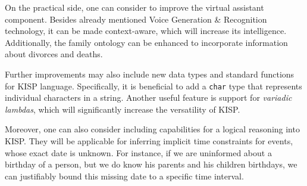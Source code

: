 On the practical side, one can consider to improve the virtual assistant component. Besides already mentioned Voice Generation \&
Recognition technology, it can be made context-aware, which will increase its intelligence. Additionally, the family ontology can
be enhanced to incorporate information about divorces and deaths.

Further improvements may also include new data types and standard functions for KISP language. Specifically, it is beneficial to
add a \texttt{char} type that represents individual characters in a string. Another useful feature is support for \textit{variadic
lambdas}, which will significantly increase the versatility of KISP.

Moreover, one can also consider including capabilities for a logical reasoning into KISP. They will be applicable for inferring
implicit time constraints for events, whose exact date is unknown. For instance, if we are uninformed about a birthday of a
person, but we do know his parents and his children birthdays, we can justifiably bound this missing date to a specific time
interval.
